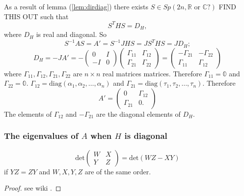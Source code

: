 As a result of lemma (\ref{lem:dirdiag}) there exists $S \in Sp(2n,\mathbb{R} \text{ or } \mathbb{C}?)$ FIND THIS OUT such that 
\begin{equation}
S^THS = D_{H},
\end{equation}
where $D_{H}$ is real and diagonal. So
\begin{equation}
S^{-1}AS = A' = S^{-1}JHS = JS^THS = JD_{H};
\end{equation}
\begin{equation}
D_{H} = -JA' = -\begin{pmatrix} 0 & I \\ -I & 0 \end{pmatrix}\begin{pmatrix}\Gamma_{11} & \Gamma_{12} \\ \Gamma_{21} & \Gamma_{22} \end{pmatrix} = \begin{pmatrix} -\Gamma_{21} & -\Gamma_{22} \\ \Gamma_{11} & \Gamma_{12} \end{pmatrix}
\end{equation}
where $\Gamma_{11}, \Gamma_{12}, \Gamma_{21}, \Gamma_{22}$ are $n \times n$ real matrices matrices. Therefore $\Gamma_{11} = \mathbb{0}$ and $\Gamma_{22} = \mathbb{0}$.  $\Gamma_{12} = \text{diag}(\alpha_1, \alpha_2, \ldots, \alpha_n)$ and $\Gamma_{21} = \text{diag}(\tau_1, \tau_2, \ldots, \tau_n)$. Therefore
\begin{equation}
A' = \begin{pmatrix} 0 & \Gamma_{12} \\ \Gamma_{21} & 0. \end{pmatrix}
\end{equation}
The elements of $\Gamma_{12}$ and $-\Gamma_{21}$ are the diagonal elements of $D_{H}$.\\

\subsubsection{The eigenvalues of $A$ when $H$ is diagonal}
\begin{lemma}
\begin{equation}
\text{det}\begin{pmatrix} W & X \\ Y & Z \end{pmatrix} = \text{det}(WZ-XY)
\end{equation}
if $YZ=ZY$ and $W, X, Y, Z$ are of the same order.
\label{lem:blockmat}
\end{lemma}
\begin{proof}
see wiki \cite{wiki}.
\end{proof}

